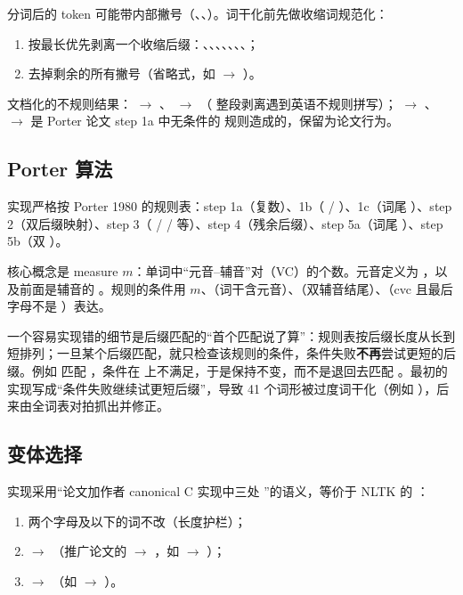 分词后的 token 可能带内部撇号（、、）。词干化前先做收缩词规范化：

\begin{enumerate}
  \item 按最长优先剥离一个收缩后缀：、、、、、、、；
  \item 去掉剩余的所有撇号（省略式，如  $\rightarrow$ ）。
\end{enumerate}

文档化的不规则结果： $\rightarrow$ 、 $\rightarrow$ （ 整段剥离遇到英语不规则拼写）； $\rightarrow$ 、 $\rightarrow$  是 Porter 论文 step 1a 中无条件的  规则造成的，保留为论文行为。

\subsection{Porter 算法}

实现严格按 Porter 1980 的规则表：step 1a（复数）、1b（ / ）、1c（词尾 ）、step 2（双后缀映射）、step 3（ /  /  等）、step 4（残余后缀）、step 5a（词尾 ）、step 5b（双 ）。

核心概念是 measure $m$：单词中“元音--辅音”对（VC）的个数。元音定义为 ，以及前面是辅音的 。规则的条件用 $m$、（词干含元音）、（双辅音结尾）、（cvc 且最后字母不是 ）表达。

一个容易实现错的细节是后缀匹配的“首个匹配说了算”：规则表按后缀长度从长到短排列；一旦某个后缀匹配，就只检查该规则的条件，条件失败\textbf{不再}尝试更短的后缀。例如  匹配 ，条件在  上不满足，于是保持不变，而不是退回去匹配 。最初的实现写成“条件失败继续试更短后缀”，导致 41 个词形被过度词干化（例如 ），后来由全词表对拍抓出并修正。

\subsection{变体选择}

实现采用“论文加作者 canonical C 实现中三处 ”的语义，等价于 NLTK 的 ：

\begin{enumerate}
  \item 两个字母及以下的词不改（长度护栏）；
  \item {} $\rightarrow$ （推广论文的  $\rightarrow$ ，如  $\rightarrow$ ）；
  \item {} $\rightarrow$ （如  $\rightarrow$ ）。
\end{enumerate}

